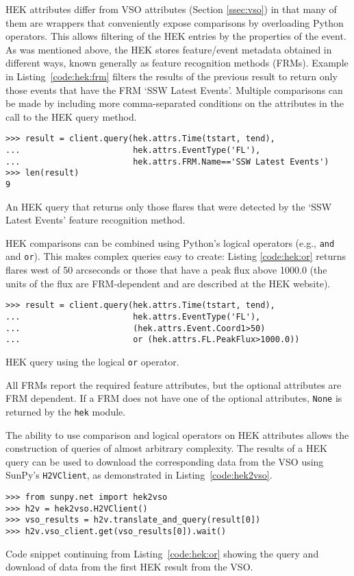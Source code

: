 HEK attributes differ from VSO attributes (Section \ref{ssec:vso}) in that many 
of them are wrappers that conveniently expose comparisons by overloading Python 
operators. This allows filtering of the HEK entries by the properties of the 
event. As was mentioned above, the HEK stores feature/event metadata obtained 
in different ways, known generally as feature recognition methods (FRMs). 
Example in Listing~\ref{code:hek:frm} filters the results of the previous 
result to return only those events that have the FRM `SSW Latest Events'.  Multiple comparisons can be made by including more comma-separated
conditions on the attributes in the call to the HEK query method.

\begin{listing}[H]
\begin{verbatim}
>>> result = client.query(hek.attrs.Time(tstart, tend), 
...                       hek.attrs.EventType('FL'),
...                       hek.attrs.FRM.Name=='SSW Latest Events')
>>> len(result)
9
\end{verbatim}
\caption{An HEK query that returns only those flares that were
  detected by the `SSW Latest Events' feature recognition method.}
\label{code:hek:frm}
\end{listing}

HEK comparisons can be combined using Python's logical operators (e.g., \texttt{and}
and \texttt{or}). This makes complex queries easy to create: Listing \ref{code:hek:or} 
returns flares west of 50 arcseconds or those that have a peak flux above 
1000.0 (the units of the flux are FRM-dependent and are described at the HEK 
website).
\begin{listing}[H]
\begin{verbatim}
>>> result = client.query(hek.attrs.Time(tstart, tend), 
...                       hek.attrs.EventType('FL'),
...                       (hek.attrs.Event.Coord1>50) 
...                       or (hek.attrs.FL.PeakFlux>1000.0))
\end{verbatim}
\caption{HEK query using the logical \texttt{or} operator.}
\label{code:hek:or}
\end{listing}
All FRMs report the required feature attributes, but the optional attributes 
are FRM dependent.  If a FRM does not have one of the optional attributes, 
\texttt{None} is returned by the \texttt{hek} module. 

The ability to use comparison and logical operators on HEK attributes allows 
the construction of queries of almost arbitrary complexity. 
The results of a HEK query can be used to download the 
corresponding data from the VSO using SunPy's \texttt{H2VClient}, as 
demonstrated in Listing~\ref{code:hek2vso}.
\begin{listing}[H]
\begin{verbatim}
>>> from sunpy.net import hek2vso
>>> h2v = hek2vso.H2VClient()
>>> vso_results = h2v.translate_and_query(result[0])
>>> h2v.vso_client.get(vso_results[0]).wait()
\end{verbatim}
\caption{Code snippet continuing from Listing~\ref{code:hek:or} showing the 
query and download of data from the first HEK result from the VSO.}
\label{code:hek2vso}
\end{listing}